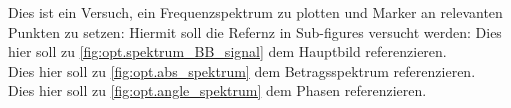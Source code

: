 \documentclass[../Report.tex]{subfiles}
\begin{document}
%    
    


Dies ist ein Versuch, ein Frequenzspektrum zu plotten und Marker an relevanten Punkten zu setzen: Hiermit soll die Refernz in Sub-figures versucht werden:
Dies hier soll zu \ref{fig:opt.spektrum_BB_signal} dem Hauptbild referenzieren.\\
Dies hier soll zu \ref{fig:opt.abs_spektrum} dem Betragsspektrum referenzieren.\\
Dies hier soll zu \ref{fig:opt.angle_spektrum} dem Phasen referenzieren.\\


 \fabsOrig 
{} \fabsRMSone 
{} \fabsRMStwo
{} \fabsRMSthree
{} \Horig
{} \HrmsOne
{} \HrmsTwo
{} \HrmsThree
 
\end{document}
